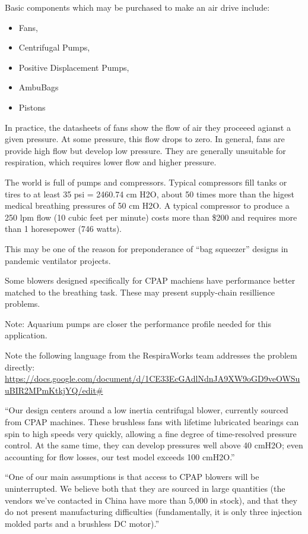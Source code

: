 \documentclass{article}
\begin{document}
Basic components which may be purchased to make an air drive include:
\begin{itemize}
\item Fans,
\item Centrifugal Pumps,
\item Positive Displacement Pumps,
\item AmbuBags
\item Pistons
\end{itemize}

In practice, the datasheets of fans show the flow of air they proceeed agianst a given pressure. At some pressure,
this flow drops to zero. In general, fans are provide high flow but develop low pressure. They are generally unsuitable
for respiration, which requires lower flow and higher pressure.

The world is full of pumps and compressors. Typical compressors fill tanks or tires to at least 35 psi = 2460.74 cm H2O,
about 50 times more than the higest medical breathing pressures of 50 cm H2O. A typical compressor to produce a 250 lpm
flow (10 cubic feet per minute) costs more than \$200 and requires more than 1 horesepower (746 watts).

This may be one of the reason for preponderance of ``bag squeezer'' designs in pandemic ventilator projects.

Some blowers designed specifically for CPAP machiens have performance better matched to the breathing task.
These may present supply-chain resillience problems.

Note: Aquarium pumps are closer the performance profile needed for this application.

Note the following language from the RespiraWorks team addresses the problem directly:
\url{https://docs.google.com/document/d/1CE33EcGAdlNdnJA9XW9oGD9veOWSuuBIR2MPmKtkjYQ/edit#}

``Our design centers around a low inertia centrifugal blower, currently sourced from CPAP machines. These brushless fans with lifetime lubricated bearings can spin to high speeds very quickly, allowing a fine degree of time-resolved pressure control. At the same time, they can develop pressures well above 40 cmH2O; even accounting for flow losses, our test model exceeds 100 cmH2O.''

``One of our main assumptions is that access to CPAP blowers will be uninterrupted. We believe both that they are sourced in large quantities (the vendors we’ve contacted in China have more than 5,000 in stock), and that they do not present manufacturing difficulties (fundamentally, it is only three injection molded parts and a brushless DC motor).''
\end{document}
